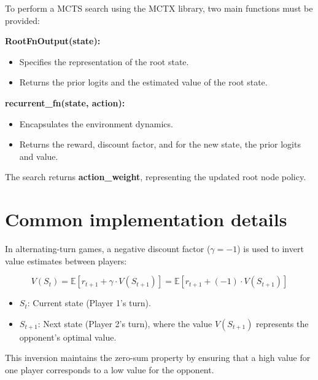 \documentclass[aspectratio=169,xcolor=dvipsnames]{beamer}
\begin{document}
\begin{frame}{}
To perform a MCTS search using the MCTX library, two main functions must be provided:

\medskip
\textbf{RootFnOutput(state):}
\begin{itemize}
    \item Specifies the representation of the root state.
    \item Returns the prior logits and the estimated value of the root state.
\end{itemize}

\medskip
\textbf{recurrent\_fn(state, action):}
\begin{itemize}
    \item Encapsulates the environment dynamics.
    \item Returns the reward, discount factor, and for the new state, the prior logits and value.
\end{itemize}


\vspace{3.0em}
The search returns \textbf{action\_weight}, representing the updated root node policy.
\end{frame}

\section{Common implementation details}


\begin{frame}{}

In alternating-turn games, a negative discount factor (\(\gamma = -1\)) is used to invert value estimates between players:

\medskip
\[
    V(S_t) = \mathbb{E} \left[ r_{t+1} + \gamma \cdot V(S_{t+1}) \right] = \mathbb{E} \left[ r_{t+1} + (-1) \cdot V(S_{t+1}) \right]
\]
\begin{itemize}
    \item \(S_t\): Current state (Player 1’s turn).
    \item \(S_{t+1}\): Next state (Player 2’s turn), where the value \(V(S_{t+1})\) represents the opponent's optimal value.
\end{itemize}

\medskip
This inversion maintains the zero-sum property by ensuring that a high value for one player corresponds to a low value for the opponent.
\end{frame}
\end{document}

